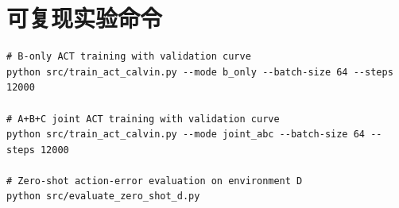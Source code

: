 \documentclass[10pt,a4paper]{ctexart}
\begin{document}
\section{可复现实验命令}
\begin{verbatim}
# B-only ACT training with validation curve
python src/train_act_calvin.py --mode b_only --batch-size 64 --steps 12000

# A+B+C joint ACT training with validation curve
python src/train_act_calvin.py --mode joint_abc --batch-size 64 --steps 12000

# Zero-shot action-error evaluation on environment D
python src/evaluate_zero_shot_d.py
\end{verbatim}
\end{document}
